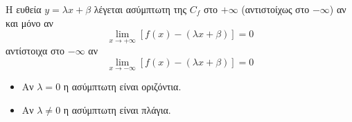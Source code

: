 Η ευθεία $ y=\lambda x+\beta $ λέγεται ασύμπτωτη της $ C_f $ στο $ +\infty $ (αντιστοίχως στο $ -\infty $) αν και μόνο αν
\[ \lim\limits_{x\to +\infty}{[f(x)-(\lambda x+\beta)]=0} \]
αντίστοιχα στο $ -\infty $ αν 
\[ \lim_{x\to -\infty}{[f(x)-(\lambda x+\beta)]=0} \]
\begin{itemize}[itemsep=0mm]
\item Αν $ \lambda=0 $ η ασύμπτωτη είναι οριζόντια.
\item Αν $ \lambda\neq 0 $ η ασύμπτωτη είναι πλάγια.
\end{itemize}
